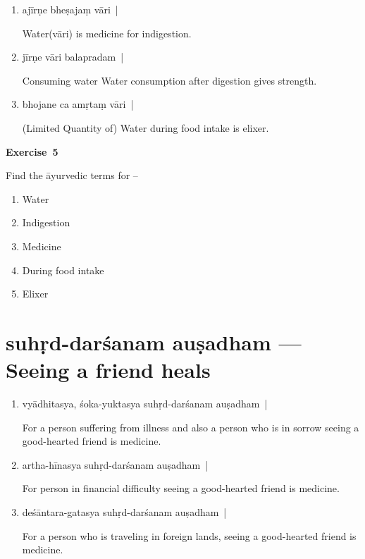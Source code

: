 \begin{enumerate}
\itemsep=0pt
\item {}

ajīrṇe bheṣajaṃ vāri~|

Water(vāri) is medicine for indigestion.

\item {}

jīrṇe vāri balapradam~|

Consuming water Water consumption after digestion gives strength.

\item {}

bhojane ca amṛtaṃ vāri~| 

(Limited Quantity of) Water during food intake is elixer. 
\end{enumerate}

\centerline{\textbf{Exercise~5}}

Find the āyurvedic terms for –
\begin{enumerate}
\itemsep=0pt
\renewcommand{\theenumi}{\alph{enumi}}
\renewcommand{\labelenumi}{\theenumi.}
\item Water
\item Indigestion
\item Medicine
\item During food intake
\item Elixer
\end{enumerate} 

\chapter{suhṛd-darśanam auṣadham --- Seeing a friend heals}

\begin{enumerate}
\itemsep=0pt
\item {}

vyādhitasya, śoka-yuktasya suhṛd-darśanam auṣadham~|

For a person suffering from illness and also a person who is in sorrow seeing a good-hearted friend is medicine. 

\item {}

artha-hīnasya suhṛd-darśanam auṣadham~|

For person in financial difficulty seeing a good-hearted friend is medicine. 

\item {}

deśāntara-gatasya suhṛd-darśanam auṣadham~|

For a person who is traveling in foreign lands, seeing a good-hearted friend is medicine.
\end{enumerate}

